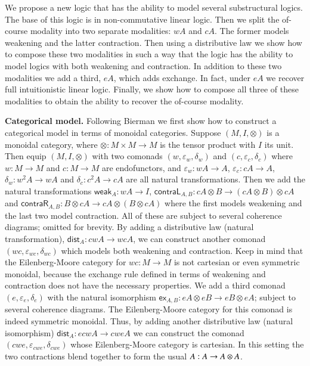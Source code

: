\documentclass{article}
\let\mto\to
\let\to\relax
\newcommand{\to}{\rightarrow}
\let\c\relax
\newcommand{\w}[1]{\mathsf{weak}_{#1}}
\newcommand{\c}[1]{\mathsf{contra}_{#1}}
\newcommand{\cL}[1]{\mathsf{contraL}_{#1}}
\newcommand{\cR}[1]{\mathsf{contraR}_{#1}}
\newcommand{\e}[1]{\mathsf{ex}_{#1}}
\begin{document}
We propose a new logic that has the ability to model several
substructural logics.  The base of this logic is in non-commutative
linear logic.  Then we split the of-course modality into two separate
modalities: $w A$ and $c A$.  The former models weakening and the
latter contraction.  Then using a distributive law we show how to
compose these two modalities in such a way that the logic has the
ability to model logics with both weakening and contraction.  In
addition to these two modalities we add a third, $e A$, which adds
exchange.  In fact, under $e A$ we recover full intuitionistic linear
logic.  Finally, we show how to compose all three of these modalities
to obtain the ability to recover the of-course modality.

\textbf{Categorical model.} Following Bierman \cite{Bierman:1994} we
first show how to construct a categorical model in terms of monoidal
categories.  Suppose $(M, I, \otimes)$ is a monoidal category, where
$\otimes : M \times M \mto M$ is the tensor product with $I$ its unit.
Then equip $(M, I, \otimes)$ with two comonads
$(w,\varepsilon_w,\delta_w)$ and $(c,\varepsilon_c,\delta_c)$ where $w
: M \mto M$ and $c : M \mto M$ are endofunctors, and $\varepsilon_w :
wA \mto A$, $\varepsilon_c : cA \mto A$, $\delta_w : w^2A \mto wA$ and
$\delta_c : c^2A \mto cA$ are all natural transformations.  Then we
add the natural transformations $\w{A} : wA \mto I$, $\cL{A,B} : cA
\otimes B \mto (cA \otimes B) \otimes cA$ and $\cR{A,B} : B \otimes cA
\mto cA \otimes (B \otimes cA)$ where the first models weakening and
the last two model contraction.  All of these are subject to several
coherence diagrams; omitted for brevity.  By adding a distributive law
(natural transformation), $\mathsf{dist}_A : cwA \mto wcA$, we can
construct another comonad $(wc,\varepsilon_{wc},\delta_{wc})$ which
models both weakening and contraction.  Keep in mind that the
Eilenberg-Moore category for $wc : M \mto M$ is not cartesian or even
symmetric monoidal, because the exchange rule defined in terms of
weakening and contraction does not have the necessary properties.  We
add a third comonad $(e,\varepsilon_e,\delta_e)$ with the natural
isomorphism $\e{A,B} : eA \otimes eB \mto eB \otimes eA$; subject
to several coherence diagrams.  The Eilenberg-Moore category for this
comonad is indeed symmetric monoidal.  Thus, by adding another
distributive law (natural isomorphism) $\mathsf{dist}_A : ecwA \mto
cweA$ we can construct the comonad
$(cwe,\varepsilon_{cwe},\delta_{cwe})$ whose Eilenberg-Moore category
is cartesian.  In this setting the two contractions blend together to
form the usual $\c{A} : A \mto A \otimes A$.
\end{document}

